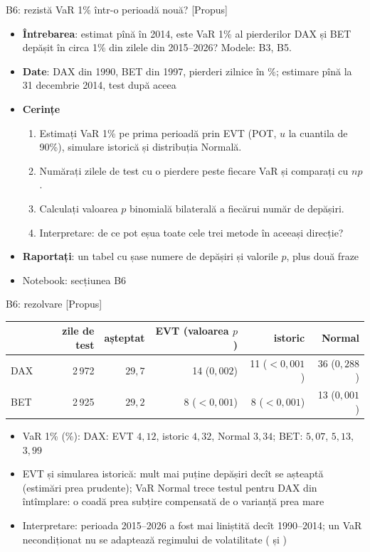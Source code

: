 \begin{frame}{B6: rezistă VaR 1\% într-o perioadă nouă? [Propus]}
\itemsize{\footnotesize}
\begin{itemize}
\item \textbf{Întrebarea}: estimat pînă în 2014, este VaR 1\% al pierderilor DAX și BET depășit în circa 1\% din zilele din 2015--2026? Modele: B3, B5.
\item \textbf{Date}: DAX din 1990, BET din 1997, pierderi zilnice în \%; estimare pînă la 31 decembrie 2014, test după aceea
\item \textbf{Cerințe}
\begin{enumerate}
    \item Estimați VaR 1\% pe prima perioadă prin EVT (POT, $u$ la cuantila de 90\%), simulare istorică și distribuția Normală.
    \item Numărați zilele de test cu o pierdere peste fiecare VaR și comparați cu $np$.
    \item Calculați valoarea $p$ binomială bilaterală a fiecărui număr de depășiri.
    \item Interpretare: de ce pot eșua toate cele trei metode în aceeași direcție?
\end{enumerate}
\item \textbf{Raportați}: un tabel cu șase numere de depășiri și valorile $p$, plus două fraze
\item Notebook: secțiunea B6
\end{itemize}
\end{frame}

\ifsolutions
\begin{frame}{B6: rezolvare [Propus]}
\itemsize{\footnotesize}
\begin{center}
\footnotesize
\begin{tabular}{lrrrrr}
\toprule
& zile de test & așteptat & EVT (valoarea $p$) & istoric & Normal \\
\midrule
DAX & 2\,972 & $29{,}7$ & 14 ($0{,}002$) & 11 ($< 0{,}001$) & 36 ($0{,}288$) \\
BET & 2\,925 & $29{,}2$ & 8 ($< 0{,}001$) & 8 ($< 0{,}001$) & 13 ($0{,}001$) \\
\bottomrule
\end{tabular}
\end{center}
\begin{itemize}
    \item VaR 1\% (\%): DAX: EVT $4{,}12$, istoric $4{,}32$, Normal $3{,}34$; BET: $5{,}07$, $5{,}13$, $3{,}99$
    \item EVT și simularea istorică: mult mai puține depășiri decît se așteaptă (estimări prea prudente); VaR Normal trece testul pentru DAX din întîmplare: o coadă prea subțire compensată de o varianță prea mare
    \item Interpretare: perioada 2015--2026 a fost mai liniștită decît 1990--2014; un VaR necondiționat nu se adaptează regimului de volatilitate ( și )
\end{itemize}
\end{frame}
\fi


